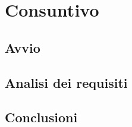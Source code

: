 \section{Consuntivo}



\subsection{Avvio}



\subsection{Analisi dei requisiti}




\subsection{Conclusioni}
